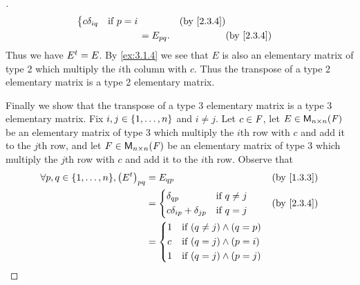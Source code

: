 \begin{proof}[]
\begin{align*}
\begin{dcases}
                                                                c \delta_{i q} & \text{if } p = i
                                                              \end{dcases}    &  & \text{(by \cref{2.3.4})}                          \\
                                                          & = E_{p q}.                                 &  & \text{(by \cref{2.3.4})}
  \end{align*}
  Thus we have \({E}^{t} = E\).
  By \cref{ex:3.1.4} we see that \(E\) is also an elementary matrix of type 2 which multiply the \(i\)th column with \(c\).
  Thus the transpose of a type 2 elementary matrix is a type 2 elementary matrix.

  Finally we show that the transpose of a type 3 elementary matrix is a type 3 elementary matrix.
  Fix \(i, j \in \left\lbrace1, \dots, n\right\rbrace\) and \(i \neq j\).
  Let \(c \in \mathit{F}\), let \(E \in \mathsf{M}_{{n} \times n}({\mathit{F}})\) be an elementary matrix of type 3 which multiply the \(i\)th row with \(c\) and add it to the \(j\)th row, and let \(F \in \mathsf{M}_{{n} \times n}({\mathit{F}})\) be an elementary matrix of type 3 which multiply the \(j\)th row with \(c\) and add it to the \(i\)th row.
  Observe that
  \begin{align*}
    \forall p, q \in \set{1, \dots, n}, \pa{\tp{E}}_{p q} & = E_{q p}                                              &  & \text{(by \cref{1.3.3})} \\
                                                          & = \begin{dcases}
                                                                \delta_{q p}                  & \text{if } q \neq j \\
                                                                c \delta_{i p} + \delta_{j p} & \text{if } q = j
                                                              \end{dcases} &  & \text{(by \cref{2.3.4})}                                \\
                                                          & = \begin{dcases}
                                                                1 & \text{if } (q \neq j) \land (q = p) \\
                                                                c & \text{if } (q = j) \land (p = i)    \\
                                                                1 & \text{if } (q = j) \land (p = j)    \\

\end{dcases}
\end{align*}
\end{proof}
